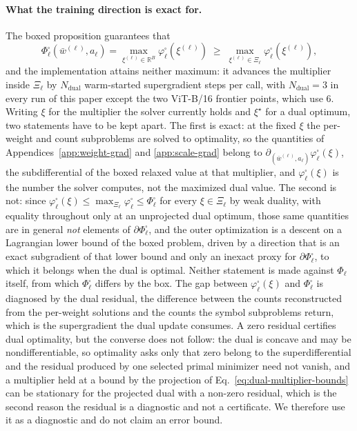 \documentclass{article}
\begin{document}
\paragraph{What the training direction is exact for.} The boxed proposition
guarantees that
\[
  \Phi_\ell^{\square}(\bar w^{(\ell)},a_\ell)
  =\max_{\xi^{(\ell)}\in\mathbb R^{B}}\varphi_\ell^{\square}(\xi^{(\ell)})
  \;\geq\;\max_{\xi^{(\ell)}\in\Xi_\ell}\varphi_\ell^{\square}(\xi^{(\ell)}),
\]
and the implementation attains neither maximum: it advances the multiplier inside
$\Xi_\ell$ by
$N_{\mathrm{dual}}$ warm-started supergradient steps per call, with
$N_{\mathrm{dual}}=3$ in every run of this paper except the two ViT-B/16 frontier
points, which use $6$. Writing $\xi$ for the multiplier the solver currently holds
and $\xi^\star$ for a dual optimum, two statements have to be kept apart. The
first is exact: at the fixed $\xi$ the per-weight and count subproblems are solved
to optimality, so the quantities of Appendices~\ref{app:weight-grad} and
\ref{app:scale-grad} belong to
$\partial_{(\bar w^{(\ell)},a_\ell)}\varphi_\ell^{\square}(\xi)$, the
subdifferential of the boxed relaxed value at that multiplier, and
$\varphi_\ell^{\square}(\xi)$ is the number the solver computes, not the maximized
dual value. The second is not: since
$\varphi_\ell^{\square}(\xi)\leq\max_{\Xi_\ell}\varphi_\ell^{\square}
\leq\Phi_\ell^{\square}$ for every $\xi\in\Xi_\ell$ by weak duality, with equality
throughout only at an unprojected dual optimum, those same quantities are in general
\emph{not} elements of $\partial\Phi_\ell^{\square}$, and the outer optimization
is a descent on a Lagrangian lower bound of the boxed problem, driven by a
direction that is an exact subgradient of that lower bound and only an inexact
proxy for $\partial\Phi_\ell^{\square}$, to which it belongs when the dual is
optimal. Neither statement is made against $\Phi_\ell$ itself, from which
$\Phi_\ell^{\square}$ differs by the box. The gap between $\varphi_\ell^{\square}(\xi)$
and $\Phi_\ell^{\square}$ is diagnosed by the dual residual, the difference between
the counts reconstructed from the per-weight solutions and the counts the symbol
subproblems return, which is the supergradient the dual update consumes. A zero
residual certifies dual optimality, but the converse does not follow: the dual is
concave and may be nondifferentiable, so optimality asks only that zero belong to
the superdifferential and the residual produced by one selected primal minimizer
need not vanish, and a multiplier held at a bound by the projection of
Eq.~\eqref{eq:dual-multiplier-bounds} can be stationary for the projected dual
with a non-zero residual, which is the second reason the residual is a diagnostic
and not a certificate. We therefore use it as a diagnostic and do not claim an
error bound.
\end{document}
